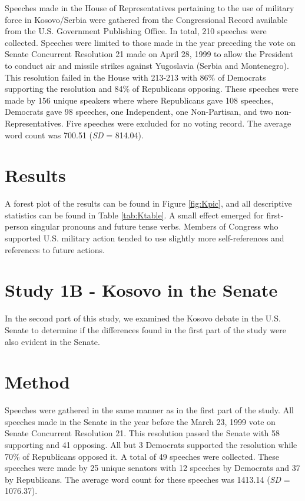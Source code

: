 \documentclass[english,man]{apa6}
\theoremstyle{definition}
\theoremstyle{definition}
\theoremstyle{definition}
\theoremstyle{remark}
\begin{document}
Speeches made in the House of Representatives pertaining to the use of
military force in Kosovo/Serbia were gathered from the Congressional
Record available from the U.S. Government Publishing Office. In total,
210 speeches were collected. Speeches were limited to those made in the
year preceding the vote on Senate Concurrent Resolution 21 made on April
28, 1999 to allow the President to conduct air and missile strikes
against Yugoslavia (Serbia and Montenegro). This resolution failed in
the House with 213-213 with 86\% of Democrats supporting the resolution
and 84\% of Republicans opposing. These speeches were made by 156 unique
speakers where where Republicans gave 108 speeches, Democrats gave 98
speeches, one Independent, one Non-Partisan, and two
non-Representatives. Five speeches were excluded for no voting record.
The average word count was 700.51 (\emph{SD} = 814.04).

\section{Results}\label{results}

A forest plot of the results can be found in Figure \ref{fig:Kpic}, and
all descriptive statistics can be found in Table \ref{tab:Ktable}. A
small effect emerged for first-person singular pronouns and future tense
verbs. Members of Congress who supported U.S. military action tended to
use slightly more self-references and references to future actions.

\section{Study 1B - Kosovo in the
Senate}\label{study-1b---kosovo-in-the-senate}

In the second part of this study, we examined the Kosovo debate in the
U.S. Senate to determine if the differences found in the first part of
the study were also evident in the Senate.

\section{Method}\label{method-2}

Speeches were gathered in the same manner as in the first part of the
study. All speeches made in the Senate in the year before the March 23,
1999 vote on Senate Concurrent Resolution 21. This resolution passed the
Senate with 58 supporting and 41 opposing. All but 3 Democrats supported
the resolution while 70\% of Republicans opposed it. A total of 49
speeches were collected. These speeches were made by 25 unique senators
with 12 speeches by Democrats and 37 by Republicans. The average word
count for these speeches was 1413.14 (\emph{SD} = 1076.37).
\end{document}
